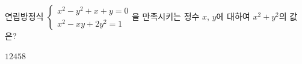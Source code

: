 연립방정식 $\begin{cases} x^2-y^2+x+y=0 \\ x^2-xy+2y^2=1 \end{cases}$을 만족시키는 정수 $x$, $y$에 대하여 $x^2+y^2$의 값은?
\begin{choices32}{$1$}{$2$}{$4$}{$5$}{$8$}\end{choices32}
